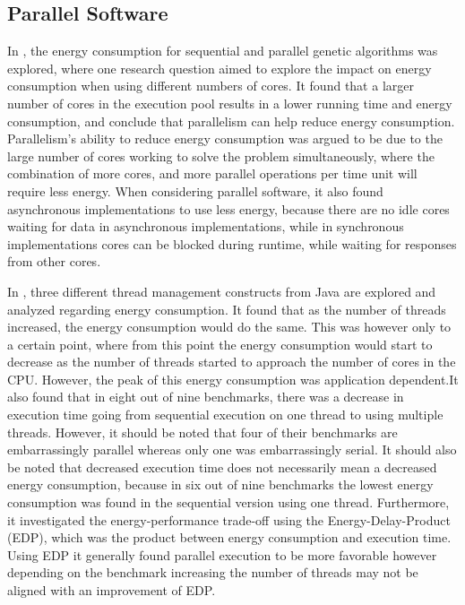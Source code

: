 \subsection{Parallel Software}

In \cite{abdelhafez2019}, the energy consumption for sequential and parallel genetic algorithms was explored, where one research question aimed to explore the impact on energy consumption when using different numbers of cores. It found that a larger number of cores in the execution pool results in a lower running time and energy consumption, and conclude that parallelism can help reduce energy consumption. Parallelism's ability to reduce energy consumption was argued to be due to the large number of cores working to solve the problem simultaneously, where the combination of more cores, and more parallel operations per time unit will require less energy. When considering parallel software, it also found asynchronous implementations to use less energy, because there are no idle cores waiting for data in asynchronous implementations, while in synchronous implementations cores can be blocked during runtime, while waiting for responses from other cores. 


In \cite{Pinto2014}, three different thread management constructs from Java are explored and analyzed regarding energy consumption. It found that as the number of threads increased, the energy consumption would do the same. This was however only to a certain point, where from this point the energy consumption would start to decrease as the number of threads started to approach the number of cores in the CPU. However, the peak of this energy consumption was application dependent.It also found that in eight out of nine benchmarks, there was a decrease in execution time going from sequential execution on one thread to using multiple threads. However, it should be noted that four of their benchmarks are embarrassingly parallel whereas only one was embarrassingly serial. It should also be noted that decreased execution time does not necessarily mean a decreased energy consumption, because in six out of nine benchmarks the lowest energy consumption was found in the sequential version using one thread. Furthermore, it investigated the energy-performance trade-off using the Energy-Delay-Product (EDP), which was the product between energy consumption and execution time. Using EDP it generally found parallel execution to be more favorable however depending on the benchmark increasing the number of threads may not be aligned with an improvement of EDP.\cite{Pinto2014}



